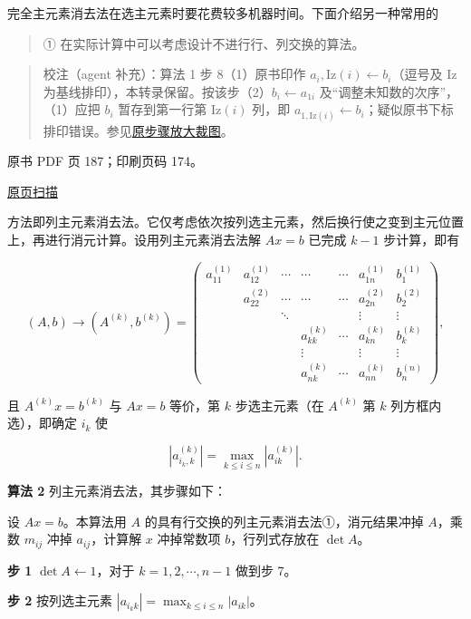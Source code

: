 完全主元素消去法在选主元素时要花费较多机器时间。下面介绍另一种常用的

\begin{quote}
① 在实际计算中可以考虑设计不进行行、列交换的算法。
\end{quote}

\begin{quote}
校注（agent 补充）：算法 1 步 8（1）原书印作 \(a_i,\mathrm{Iz}(i)\leftarrow b_i\)（逗号及 Iz 为基线排印），本转录保留。按该步（2）\(b_i\leftarrow a_{1i}\) 及``调整未知数的次序''，（1）应把 \(b_i\) 暂存到第一行第 \(\mathrm{Iz}(i)\) 列，即 \(a_{1,\mathrm{Iz}(i)}\leftarrow b_i\)；疑似原书下标排印错误。参见\href{verified/assets/ch07a/pdf-186-step8-detail.png}{原步骤放大裁图}。
\end{quote}

\clearpage

原书 PDF 页 187；印刷页码 174。

\href{source-images/pdf-187.jpeg}{原页扫描}

方法即列主元素消去法。它仅考虑依次按列选主元素，然后换行使之变到主元位置上，再进行消元计算。设用列主元素消去法解 \(Ax=b\) 已完成 \(k-1\) 步计算，即有

\[
(A,b)\to(A^{(k)},b^{(k)})=
\left(\begin{array}{cccccc|c}
a_{11}^{(1)}&a_{12}^{(1)}&\cdots&\cdots&\cdots&a_{1n}^{(1)}&b_1^{(1)}\\
&a_{22}^{(2)}&\cdots&\cdots&\cdots&a_{2n}^{(2)}&b_2^{(2)}\\
&&\ddots&&&\vdots&\vdots\\
&&&a_{kk}^{(k)}&\cdots&a_{kn}^{(k)}&b_k^{(k)}\\
&&&\vdots&&\vdots&\vdots\\
&&&a_{nk}^{(k)}&\cdots&a_{nn}^{(k)}&b_n^{(n)}
\end{array}\right),
\]

且 \(A^{(k)}x=b^{(k)}\) 与 \(Ax=b\) 等价，第 \(k\) 步选主元素（在 \(A^{(k)}\) 第 \(k\) 列方框内选），即确定 \(i_k\) 使

\[|a_{i_k,k}^{(k)}|=\max_{k\le i\le n}|a_{ik}^{(k)}|.\]

\textbf{算法 2} 列主元素消去法，其步骤如下：

设 \(Ax=b\)。本算法用 \(A\) 的具有行交换的列主元素消去法①，消元结果冲掉 \(A\)，乘数 \(m_{ij}\) 冲掉 \(a_{ij}\)，计算解 \(x\) 冲掉常数项 \(b\)，行列式存放在 \(\det A\)。

\textbf{步 1} \(\det A\leftarrow1\)，对于 \(k=1,2,\cdots,n-1\) 做到步 7。

\textbf{步 2} 按列选主元素 \(|a_{i_kk}|=\max_{k\le i\le n}|a_{ik}|\)。

